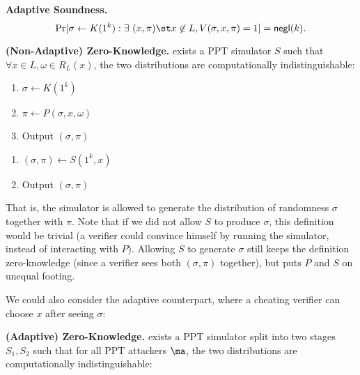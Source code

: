 \medskip
\noindent\textbf{Adaptive Soundness.}
    $$\Pr[\sigma \gets K(1^k): \exists~ (x, \pi) \st  x \not\in L, V(\sigma, x, \pi)
    = 1] = \mathsf{negl}(k).$$

\medskip
\noindent\textbf{(Non-Adaptive) Zero-Knowledge.}
    \DIFdelbegin {}\DIFdelend \DIFaddbegin {}\DIFaddend exists a PPT simulator $S$ such that $\forall x \in L, \omega \in
    R_L(x)$, the two distributions are computationally indistinguishable:

\begin{minipage}{0.5\textwidth}
    \begin{enumerate}[itemsep=-3pt]
        \item $\sigma \gets K(1^k)$
        \item $\pi \gets P(\sigma, x, \omega)$
        \item Output $(\sigma, \pi)$
    \end{enumerate}
\end{minipage}
\begin{minipage}{0.5\textwidth}
    \begin{enumerate}
        \item $(\sigma, \pi) \gets S(1^k, x)$
        \item Output $(\sigma, \pi)$
    \end{enumerate}
\end{minipage}

\medskip
That is, the simulator is allowed to generate the distribution of randomness
$\sigma$ together with $\pi$. Note that if we did not allow $S$ to produce
$\sigma$, this definition would be trivial (a verifier could convince himself by
running the simulator, instead of interacting with $P$). Allowing $S$ to
generate $\sigma$ still keeps the definition zero-knowledge (since a verifier sees both $(\sigma,
\pi)$ together), but puts $P$ and $S$ on unequal footing.

We could also consider the adaptive counterpart, where a cheating verifier can
choose $x$ after seeing $\sigma$:

\medskip
\noindent\textbf{(Adaptive) Zero-Knowledge.}
    \DIFdelbegin {}\DIFdelend \DIFaddbegin {}\DIFaddend exists a PPT simulator split into two stages $S_1, S_2$ such that
    for all PPT attackers $\ma$,
    the two distributions are computationally indistinguishable:

